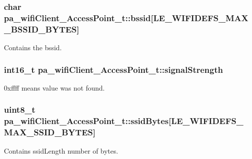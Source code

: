 \subsubsection[{\texorpdfstring{bssid}{bssid}}]{\setlength{\rightskip}{0pt plus 5cm}char pa\+\_\+wifi\+Client\+\_\+\+Access\+Point\+\_\+t\+::bssid\mbox{[}{\bf L\+E\+\_\+\+W\+I\+F\+I\+D\+E\+F\+S\+\_\+\+M\+A\+X\+\_\+\+B\+S\+S\+I\+D\+\_\+\+B\+Y\+T\+ES}\mbox{]}}\hypertarget{structpa__wifi_client___access_point__t_aab0cb346c9fad269aa5bd07bd33a4beb}{}\label{structpa__wifi_client___access_point__t_aab0cb346c9fad269aa5bd07bd33a4beb}


Contains the bssid. 

\subsubsection[{\texorpdfstring{signal\+Strength}{signalStrength}}]{\setlength{\rightskip}{0pt plus 5cm}int16\+\_\+t pa\+\_\+wifi\+Client\+\_\+\+Access\+Point\+\_\+t\+::signal\+Strength}\hypertarget{structpa__wifi_client___access_point__t_ab90c934c220c7ee22f20ac8bb1067dbf}{}\label{structpa__wifi_client___access_point__t_ab90c934c220c7ee22f20ac8bb1067dbf}


0xffff means value was not found. 

\subsubsection[{\texorpdfstring{ssid\+Bytes}{ssidBytes}}]{\setlength{\rightskip}{0pt plus 5cm}uint8\+\_\+t pa\+\_\+wifi\+Client\+\_\+\+Access\+Point\+\_\+t\+::ssid\+Bytes\mbox{[}{\bf L\+E\+\_\+\+W\+I\+F\+I\+D\+E\+F\+S\+\_\+\+M\+A\+X\+\_\+\+S\+S\+I\+D\+\_\+\+B\+Y\+T\+ES}\mbox{]}}\hypertarget{structpa__wifi_client___access_point__t_a94c7b740ceb19475fc8a5014d45c4dc8}{}\label{structpa__wifi_client___access_point__t_a94c7b740ceb19475fc8a5014d45c4dc8}


Contains ssid\+Length number of bytes. 

